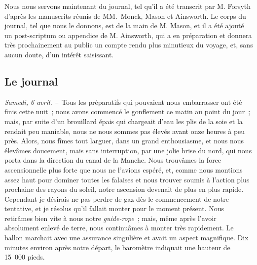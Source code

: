 \documentclass[french,twoside]{book} %
\begin{document}
Nous nous servons maintenant du journal, tel qu’il a été transcrit par M. Forsyth d’après les manuscrits réunis de MM. Monck, Mason et Ainsworth. Le corps du journal, tel que nous le donnons, est de la main de M. Mason, et il a été ajouté un post-scriptum ou appendice de M. Ainsworth, qui a en préparation et donnera très prochainement au public un compte rendu plus minutieux du voyage, et, sans aucun doute, d’un intérêt saisissant.
\subsection[{Le journal}]{Le journal}
\noindent \emph{Samedi, 6 avril. –} Tous les préparatifs qui pouvaient nous embarrasser ont été finis cette nuit ; nous avons commencé le gonflement ce matin au point du jour ; mais, par suite d’un brouillard épais qui chargeait d’eau les plis de la soie et la rendait peu maniable, nous ne nous sommes pas élevés avant onze heures à peu près. Alors, nous fîmes tout larguer, dans un grand enthousiasme, et nous nous élevâmes doucement, mais sans interruption, par une jolie brise du nord, qui nous porta dans la direction du canal de la Manche. Nous trouvâmes la force ascensionnelle plus forte que nous ne l’avions espéré, et, comme nous montions assez haut pour dominer toutes les falaises et nous trouver soumis à l’action plus prochaine des rayons du soleil, notre ascension devenait de plus en plus rapide. Cependant je désirais ne pas perdre de gaz dès le commencement de notre tentative, et je résolus qu’il fallait monter pour le moment présent. Nous retirâmes bien vite à nous notre \emph{guide-rope} ; mais, même après l’avoir absolument enlevé de terre, nous continuâmes à monter très rapidement. Le ballon marchait avec une assurance singulière et avait un aspect magnifique. Dix minutes environ après notre départ, le baromètre indiquait une hauteur de 15 000 pieds.\par
\end{document}

